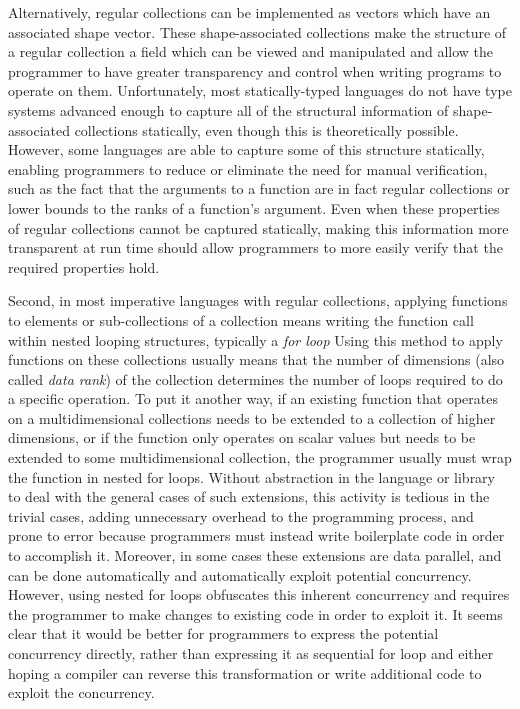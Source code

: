Alternatively, regular collections can be implemented as vectors which have an associated shape vector. 
These shape-associated collections make the structure of a regular collection 
a field which can be viewed and manipulated and allow the programmer to have 
greater transparency and control when writing programs to operate on them.
Unfortunately, most statically-typed languages do not have type systems advanced enough 
to capture all of the structural information of shape-associated collections statically, 
even though this is theoretically possible. %
However, some languages are able to capture some of this structure statically, \cite{boost} \cite{sac} \cite{dph}
enabling programmers to reduce or eliminate the need for manual verification, 
such as the fact that the arguments to a function are in fact regular collections or lower bounds to the ranks of a function's argument.
Even when these properties of regular collections cannot be captured statically, 
making this information more transparent at run time 
should allow programmers to more easily verify that the required properties hold.

Second, in most imperative languages with regular collections, 
applying functions to elements or sub-collections of a collection means 
writing the function call within nested looping structures, typically a \textit{for loop}
Using this method to apply functions on these collections usually means that 
the number of dimensions (also called \textit{data rank}) of the collection 
determines the number of loops required to do a specific operation.
To put it another way, if an existing function that operates on a multidimensional collections 
needs to be extended to a collection of higher dimensions, 
or if the function only operates on scalar values but needs to be extended to some multidimensional collection, 
the programmer usually must wrap the function in nested for loops.
Without abstraction in the language or library to deal with the general cases of such extensions, 
this activity is tedious in the trivial cases, adding unnecessary overhead to the programming process,
and prone to error because programmers must instead write boilerplate code in order to accomplish it.
Moreover, in some cases these extensions are data parallel, 
and can be done automatically and automatically exploit potential concurrency.
However, using nested for loops obfuscates this inherent concurrency and 
requires the programmer to make changes to existing code in order to exploit it.
It seems clear that it would be better for programmers to express the potential concurrency directly, 
rather than expressing it as sequential for loop and either hoping a compiler can reverse this transformation 
or write additional code to exploit the concurrency.

